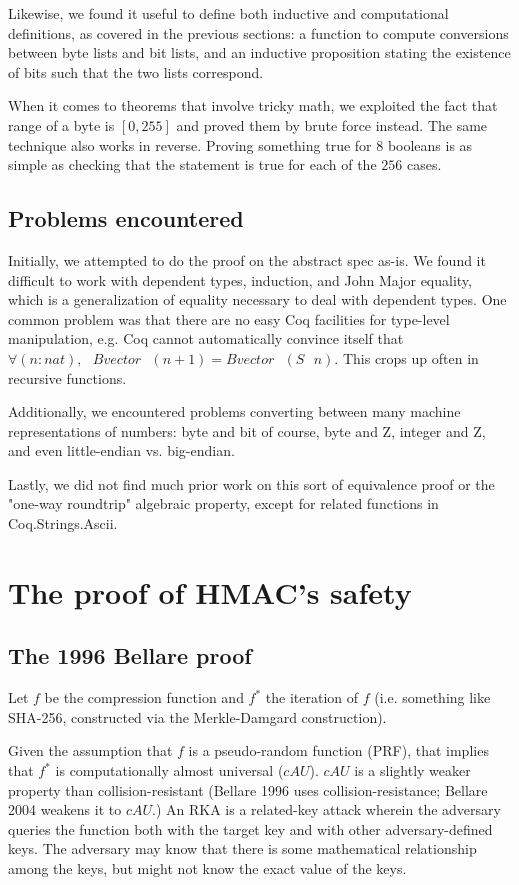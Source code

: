 \documentclass[twocolumn,showpacs,%
  nofootinbib,aps,superscriptaddress,%
  eqsecnum,prd,notitlepage,showkeys,10pt]{revtex4-1}
\newcommand{\s} {\textrm{ }}
\begin{document}
Likewise, we found it useful to define both inductive and computational definitions, as covered in the previous sections: a function to compute conversions between byte lists and bit lists, and an inductive proposition stating the existence of bits such that the two lists correspond.

When it comes to theorems that involve tricky math, we exploited the fact that range of a byte is $[0, 255]$ and proved them by brute force instead. The same technique also works in reverse. Proving something true for $8$ booleans is as simple as checking that the statement is true for each of the $256$ cases. %

\subsection{Problems encountered}

Initially, we attempted to do the proof on the abstract spec as-is. We found it difficult to work with dependent types, induction, and John Major equality, which is a generalization of equality necessary to deal with dependent types. One common problem was that there are no easy Coq facilities for type-level manipulation, e.g. Coq cannot automatically convince itself that $\forall (n : nat), \s Bvector \s (n+1) = Bvector \s (S \s n)$. This crops up often in recursive functions.

Additionally, we encountered problems converting between many machine representations of numbers: byte and bit of course, byte and Z, integer and Z, and even little-endian vs. big-endian.

Lastly, we did not find much prior work on this sort of equivalence proof or the "one-way roundtrip" algebraic property, except for related functions in Coq.Strings.Ascii.

\section{The proof of HMAC's safety}

\subsection{The 1996 Bellare proof}

Let $f$ be the compression function and $f^*$ the iteration of $f$ (i.e. something like SHA-256, constructed via the Merkle-Damgard construction).

Given the assumption that $f$ is a pseudo-random function (PRF), that implies that $f^*$ is computationally almost universal ($cAU$). $cAU$ is a slightly weaker property than collision-resistant (Bellare 1996 uses collision-resistance; Bellare 2004 weakens it to $cAU$.) An RKA is a related-key attack wherein the adversary queries the function both with the target key and with other adversary-defined keys. The adversary may know that there is some mathematical relationship among the keys, but might not know the exact value of the keys.
\end{document}
